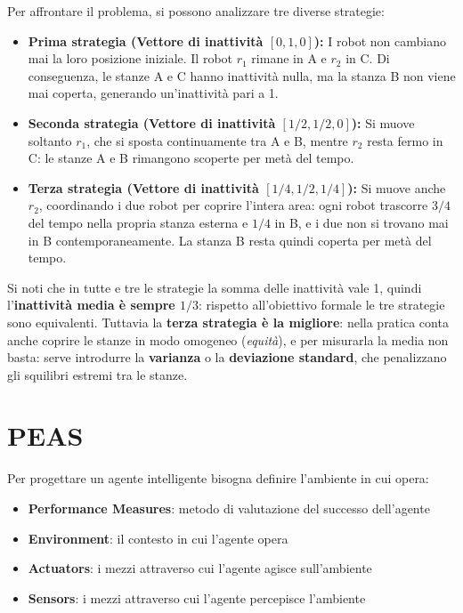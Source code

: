\documentclass[a4paper, 11pt, oneside]{book}
\theoremstyle{definition}
\begin{document}
	Per affrontare il problema, si possono analizzare tre diverse strategie:
	\begin{itemize}
		\item \textbf{Prima strategia (Vettore di inattivit\`a $[0, 1, 0]$):} I
			robot non cambiano mai la loro posizione iniziale. Il robot $r_{1}$ rimane
			in A e $r_{2}$ in C. Di conseguenza, le stanze A e C hanno inattivit\`a nulla,
			ma la stanza B non viene mai coperta, generando un'inattivit\`a pari a 1.

		\item \textbf{Seconda strategia (Vettore di inattivit\`a $[1/2, 1/2, 0]$):}
			Si muove soltanto $r_{1}$, che si sposta continuamente tra A e B, mentre
			$r_{2}$ resta fermo in C: le stanze A e B rimangono scoperte per met\`a del
			tempo.

		\item \textbf{Terza strategia (Vettore di inattivit\`a $[1/4, 1/2, 1/4]$):}
			Si muove anche $r_{2}$, coordinando i due robot per coprire l'intera
			area: ogni robot trascorre $3/4$ del tempo nella propria stanza esterna e
			$1/4$ in B, e i due non si trovano mai in B contemporaneamente. La stanza
			B resta quindi coperta per met\`a del tempo.
	\end{itemize}

	Si noti che in tutte e tre le strategie la somma delle inattivit\`a vale 1, quindi
	l'\textbf{inattivit\`a media \`e sempre $1/3$}: rispetto all'obiettivo formale
	le tre strategie sono equivalenti. Tuttavia la \textbf{terza strategia \`e la migliore}:
	nella pratica conta anche coprire le stanze in modo omogeneo (\emph{equit\`a}), e per
	misurarla la media non basta: serve introdurre la \textbf{varianza} o la
	\textbf{deviazione standard}, che penalizzano gli squilibri estremi tra le stanze.

	\section{PEAS}
	Per progettare un agente intelligente bisogna definire l'ambiente in cui opera:
	\begin{itemize}
		\item \textbf{Performance Measures}: metodo di valutazione del successo dell'agente

		\item \textbf{Environment}: il contesto in cui l'agente opera

		\item \textbf{Actuators}: i mezzi attraverso cui l'agente agisce sull'ambiente

		\item \textbf{Sensors}: i mezzi attraverso cui l'agente percepisce l'ambiente
	\end{itemize}
\end{document}
